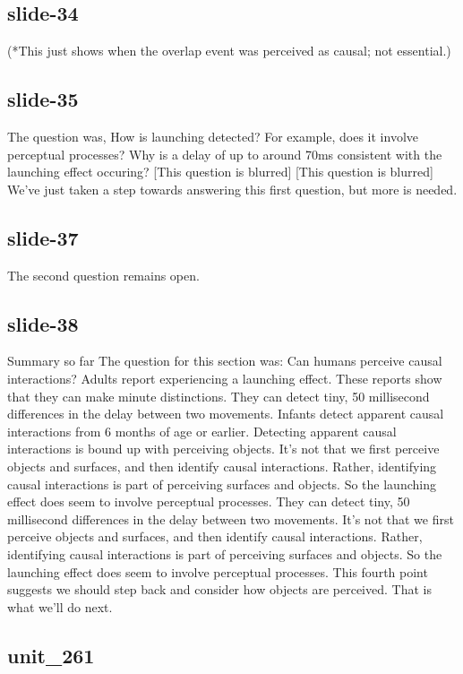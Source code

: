 \documentclass[12pt,\papersize]{extarticle}
\begin{document}
 
\subsection{slide-34}
(*This just shows when the overlap event was perceived as causal; not essential.)
 
 
\subsection{slide-35}
The question was,
How is launching detected? For example, does it involve perceptual processes?
Why is a delay of up to around 70ms consistent with the launching effect occuring?
[This question is blurred]
[This question is blurred]
We've just taken a step towards answering this first question, but more is needed.
 
 
\subsection{slide-37}
The second question remains open.
 
 
\subsection{slide-38}
Summary so far
The question for this section was:
Can humans perceive causal interactions?
Adults report experiencing a launching effect.
These reports show that they can make minute distinctions.
They can detect tiny, 50 millisecond differences in the delay between two movements.
Infants detect apparent causal interactions from 6 months of age or earlier.
Detecting apparent causal interactions is bound up with perceiving objects.
It's not that we first perceive objects and surfaces, and then identify causal interactions. Rather, identifying causal interactions is part of perceiving surfaces and objects. So the launching effect does seem to involve perceptual processes.
They can detect tiny, 50 millisecond differences in the delay between two movements.
It's not that we first perceive objects and surfaces, and then identify causal interactions. Rather, identifying causal interactions is part of perceiving surfaces and objects. So the launching effect does seem to involve perceptual processes.
This fourth point suggests we should step back and consider how objects are perceived. That is what we'll do next.
 
 
\subsection{unit\_261}
 
\end{document}
